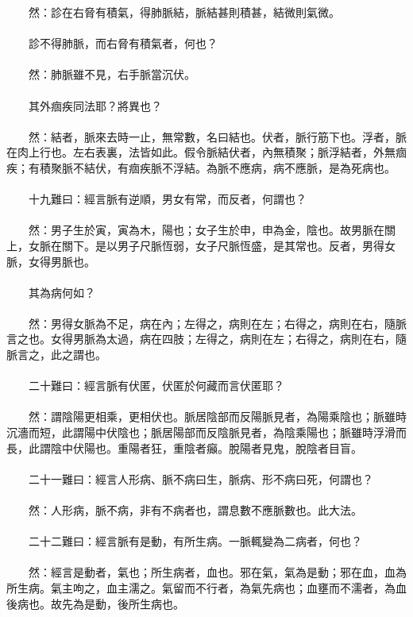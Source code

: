 　　然：診在右脅有積氣，得肺脈結，脈結甚則積甚，結微則氣微。
\\\\
　　診不得肺脈，而右脅有積氣者，何也？
\\\\
　　然：肺脈雖不見，右手脈當沉伏。
\\\\
　　其外痼疾同法耶？將異也？
\\\\
　　然：結者，脈來去時一止，無常數，名曰結也。伏者，脈行筋下也。浮者，脈在肉上行也。左右表裏，法皆如此。假令脈結伏者，內無積聚；脈浮結者，外無痼疾；有積聚脈不結伏，有痼疾脈不浮結。為脈不應病，病不應脈，是為死病也。
\\\\
　　十九難曰：經言脈有逆順，男女有常，而反者，何謂也？
\\\\
　　然：男子生於寅，寅為木，陽也；女子生於申，申為金，陰也。故男脈在關上，女脈在關下。是以男子尺脈恆弱，女子尺脈恆盛，是其常也。反者，男得女脈，女得男脈也。
\\\\
　　其為病何如？
\\\\
　　然：男得女脈為不足，病在內；左得之，病則在左；右得之，病則在右，隨脈言之也。女得男脈為太過，病在四肢；左得之，病則在左；右得之，病則在右，隨脈言之，此之謂也。
\\\\
　　二十難曰：經言脈有伏匿，伏匿於何藏而言伏匿耶？
\\\\
　　然：謂陰陽更相乘，更相伏也。脈居陰部而反陽脈見者，為陽乘陰也；脈雖時沉濇而短，此謂陽中伏陰也；脈居陽部而反陰脈見者，為陰乘陽也；脈雖時浮滑而長，此謂陰中伏陽也。重陽者狂，重陰者癲。脫陽者見鬼，脫陰者目盲。
\\\\
　　二十一難曰：經言人形病、脈不病曰生，脈病、形不病曰死，何謂也？
\\\\
　　然：人形病，脈不病，非有不病者也，謂息數不應脈數也。此大法。
\\\\
　　二十二難曰：經言脈有是動，有所生病。一脈輒變為二病者，何也？
\\\\
　　然：經言是動者，氣也；所生病者，血也。邪在氣，氣為是動；邪在血，血為所生病。氣主呴之，血主濡之。氣留而不行者，為氣先病也；血壅而不濡者，為血後病也。故先為是動，後所生病也。
\\\\

